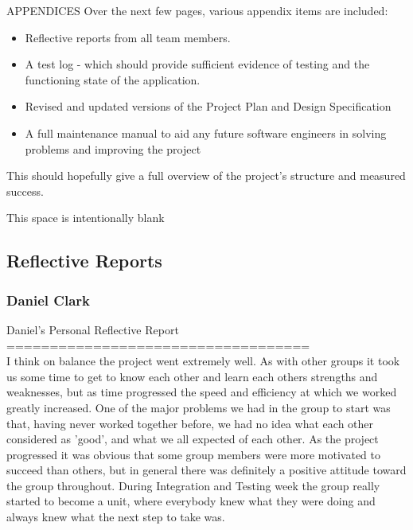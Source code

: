 \documentclass{article}
\begin{document}
	\begin{section}{APPENDICES}
		Over the next few pages, various appendix items are included:
		
		\begin{itemize}
			\item{Reflective reports from all team members.}
			\item{A test log - which should provide sufficient evidence of testing and the functioning state of the application.}
			\item{Revised and updated versions of the Project Plan and Design Specification}
			\item{A full maintenance manual to aid any future software engineers in solving problems and improving the project}
		\end{itemize}

		This should hopefully give a full overview of the project's structure and measured success.
		
		\vspace{3in}
		\begin{center}
			This space is intentionally blank
		\end{center}
		
		\clearpage
		\subsection{Reflective Reports}
			\subsubsection{Daniel Clark}
				\begin{tt}
				Daniel's Personal Reflective Report \\
				=================================== \\

				I think on balance the project went extremely well. As with other groups it took us some time to get to know each other and learn each others strengths and weaknesses, but as time progressed the speed and efficiency at which we worked greatly increased. One of the major problems we had in the group to start was that, having never worked together before, we had no idea what each other considered as 'good', and what we all expected of each other. As the project progressed it was obvious that some group members were more motivated to succeed than others, but in general there was definitely a positive attitude toward the group throughout. During Integration and Testing week the group really started to become a unit, where everybody knew what they were doing and always knew what the next step to take was. \\


\end{tt}
\end{section}
\end{document}
